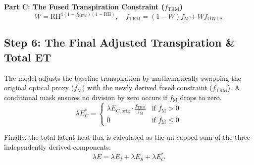 \documentclass[11pt]{article}
\begin{document}
\textbf{Part C: The Fused Transpiration Constraint ($f_{\mathrm{TRM}}$)}
\[
  W = \mathrm{RH}^{4(1-f_{\mathrm{REW}})(1-\mathrm{RH})},\quad f_{\mathrm{TRM}} = (1 - W)f_{\mathrm{M}} + W f_{\mathrm{OWUS}}
\]

\subsection*{Step 6: The Final Adjusted Transpiration \& Total ET}

The model adjusts the baseline transpiration by mathematically swapping the original optical proxy ($f_{\mathrm{M}}$) with the newly derived fused constraint ($f_{\mathrm{TRM}}$). A conditional mask ensures no division by zero occurs if $f_{\mathrm{M}}$ drops to zero.
\[
  \lambda E_{C}^\ast = \begin{cases}
    \lambda E_{C,\mathrm{orig}} \cdot \frac{f_{\mathrm{TRM}}}{f_{\mathrm{M}}} & \text{if } f_{\mathrm{M}} > 0 \\
    0 & \text{if } f_{\mathrm{M}} \le 0
  \end{cases}
\]

Finally, the total latent heat flux is calculated as the un-capped sum of the three independently derived components:
\[
  \lambda E = \lambda E_I + \lambda E_S + \lambda E_{C}^\ast
\]
\end{document}
